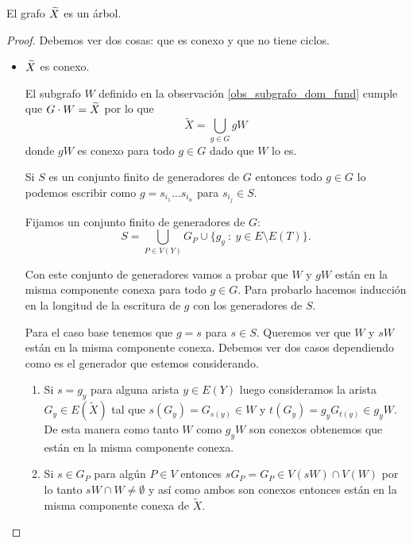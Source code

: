 \documentclass[tesis.tex]{subfiles}
\begin{document}
\begin{teo}[Serre]
	El grafo $\widetilde X$ es un árbol.
\end{teo}
\begin{proof}
	Debemos ver dos cosas: que es conexo y que no tiene ciclos.
	
	\begin{itemize}
		\item 
		$\widetilde X$ es conexo.
		
		
		El subgrafo $W$ definido en la observación \ref{obs_subgrafo_dom_fund} cumple que $G \cdot W = \widetilde X$ por lo que 
		\[
		\widetilde X = \bigcup_{g \in G} gW
		\]
		donde $gW$ es conexo para todo $g \in G$ dado que $W$ lo es.
		
		Si $S$ es un conjunto finito de generadores de $G$ entonces todo $g \in G$ lo podemos escribir como $g = s_{i_1} \dots s_{i_n}$ para $s_{i_j} \in S$.
		
		
		Fijamos un conjunto finito de generadores de $G$: 
		\[
		S = \bigcup_{P \in V(Y)} G_{P} \cup \{ g_y \ : \ y \in E \setminus E(T) \}.   
		\] 
		
		Con este conjunto de generadores vamos a probar que $W$ y $gW$ están en la misma componente conexa para todo $g \in G$.
		Para probarlo hacemos inducción en la longitud de la escritura de $g$ con los generadores de $S$.


		Para el caso base tenemos que $g = s$ para $s \in S$.
		Queremos ver que $W$ y $sW$ están en la misma componente conexa.
		Debemos ver dos casos dependiendo como es el generador que estemos considerando.
		\begin{enumerate}
			\item Si $s=g_y$ para alguna arista $y \in E(Y)$ luego consideramos la arista $G_{y} \in E(\widetilde{X})$ tal que $s(G_{y}) = G_{s(y)} \in W$ y $t(G_{y}) = g_{y}G_{t(y)} \in g_{y}W$.
			De esta manera como tanto $W$ como $g_{y}W$ son conexos obtenemos que están en la misma componente conexa.
			
			\item Si $s \in G_P$ para algún $P \in V$ entonces $s G_P = G_P \in V(sW) \cap V(W)$ por lo tanto $sW \cap W \neq \emptyset$ y así como ambos son conexos entonces están en la misma componente conexa de $\widetilde{X}$.
		\end{enumerate} 


\end{itemize}
\end{proof}
\end{document}
